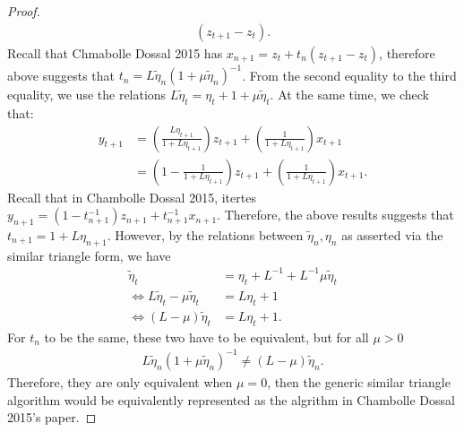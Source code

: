 \documentclass[12pt]{article}
\begin{document}
\begin{proof}
\begin{align*}
                (z_{t + 1} - z_t). 
            \end{align*}
            Recall that Chmabolle Dossal 2015 has $x_{n + 1} = z_t + t_n(z_{t + 1} - z_t)$, 
            therefore above suggests that $t_n = L \tilde \eta_{n}(1 + \mu \tilde \eta_{n})^{-1}$. 
            From the second equality to the third equality, we use the relations $L\tilde \eta_{t} = \eta_t + 1 + \mu\tilde \eta_{t}$.
            At the same time, we check that: 
            \begin{align*}
                y_{t + 1} &= \left(
                    \frac{L\eta_{t + 1}}{1 + L \eta_{t + 1}}
                \right)z_{t + 1} + 
                \left(
                    \frac{1}{1 + L \eta_{t + 1}}
                \right) x_{t + 1}
                \\
                &= 
                \left(
                    1 - \frac{1}{1 + L\eta_{t + 1}}
                \right)z_{t + 1} + 
                \left(
                    \frac{1}{1 + L \eta_{t + 1}}
                \right)x_{t + 1}. 
            \end{align*}
            Recall that in Chambolle Dossal 2015, itertes $y_{n + 1} = (1 - t_{n + 1}^{-1})z_{n + 1} + t_{n + 1}^{-1} x_{n + 1}$. 
            Therefore, the above results suggests that $t_{n + 1} = 1 + L\eta_{n + 1}$. 
            However, by the relations between $\tilde \eta_n, \eta_n$ as asserted via the similar triangle form, we have 
            \begin{align*}
                \tilde \eta_t &= \eta_t + L^{-1} + L^{-1}\mu \tilde \eta_t
                \\
                \iff 
                L\tilde \eta_t - \mu \tilde \eta_t 
                &= 
                L \eta_t + 1
                \\
                \iff 
                (L - \mu)\tilde \eta_t &= L\eta_t + 1. 
            \end{align*}
            For $t_n$ to be the same, these two have to be equivalent, but for all $\mu > 0$
            \begin{align*}
                L\tilde \eta_n (1 + \mu \tilde \eta_n)^{-1} \not = 
                (L - \mu )\tilde \eta_n. 
            \end{align*}
            Therefore, they are only equivalent when $\mu = 0$, then the generic similar triangle algorithm would be equivalently represented as the algrithm in Chambolle Dossal 2015's paper. 
        \end{proof}
\end{document}
